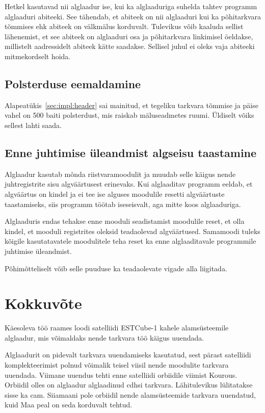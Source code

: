 \documentclass[12pt,a4paper]{article}
\begin{document}
Hetkel kasutavad nii alglaadur ise, kui ka alglaaduriga suhelda tahtev programm
alglaaduri abiteeki. See tähendab, et abiteek on nii alglaaduri kui ka
põhitarkvara tõmmises ehk abiteek on välkmälus korduvalt. Tulevikus võib
kaaluda sellist lähenemist, et see abiteek on alglaaduri osa ja põhitarkvara
linkimisel öeldakse, millistelt aadressidelt abiteek kätte saadakse. Sellisel
juhul ei oleks vaja abiteeki mitmekordselt hoida.

\subsection{Polsterduse eemaldamine}
Alapeatükis~\ref{sec:impl:header} sai mainitud, et tegeliku tarkvara tõmmise ja
päise vahel on 500 baiti polsterdust, mis raiskab mäluseadmetes ruumi. Üldiselt
võiks sellest lahti saada.

\subsection{Enne juhtimise üleandmist algseisu taastamine}
Alglaadur kasutab mõnda riistvaramoodulit ja muudab selle käigus nende
juhtregistrite sisu algväärtusest erinevaks. Kui alglaaditav programm eeldab,
et algväärtus on kindel ja ei tee ise alguses moodulile resetti algväärtuste
taastamiseks, siis programm töötab iseseisvalt, aga mitte koos alglaaduriga.

Alglaaduris endas tehakse enne mooduli seadistamist moodulile reset, et olla
kindel, et mooduli registrites oleksid teadaolevad algväärtused. Samamoodi
tuleks kõigile kasutatavatele moodulitele teha reset ka enne alglaaditavale
programmile juhtimise üleandmist.

Põhimõtteliselt võib selle puuduse ka teadaolevate vigade alla liigitada.

\section{Kokkuvõte}
Käesoleva töö raames loodi satelliidi ESTCube-1 kahele alamsüsteemile alglaadur,
mis võimaldaks nende tarkvara töö käigus uuendada. 

Alglaadurit on pidevalt tarkvara uuendamiseks kasutatud, sest pärast satelliidi
komplekteerimist polnud võimalik teisel viisil nende moodulite tarkvara
uuendada. Viimane uuendus tehti enne satelliidi orbiidile viimist Kourous.
Orbiidil olles on alglaadur alglaadinud \gls{cdhs}i tarkvara.  Lähitulevikus
lülitatakse sisse ka \gls{cam}. Siiamaani pole orbiidil nende alamsüsteemide
tarkvara uuendatud, kuid Maa peal on seda korduvalt tehtud. 
\end{document}
